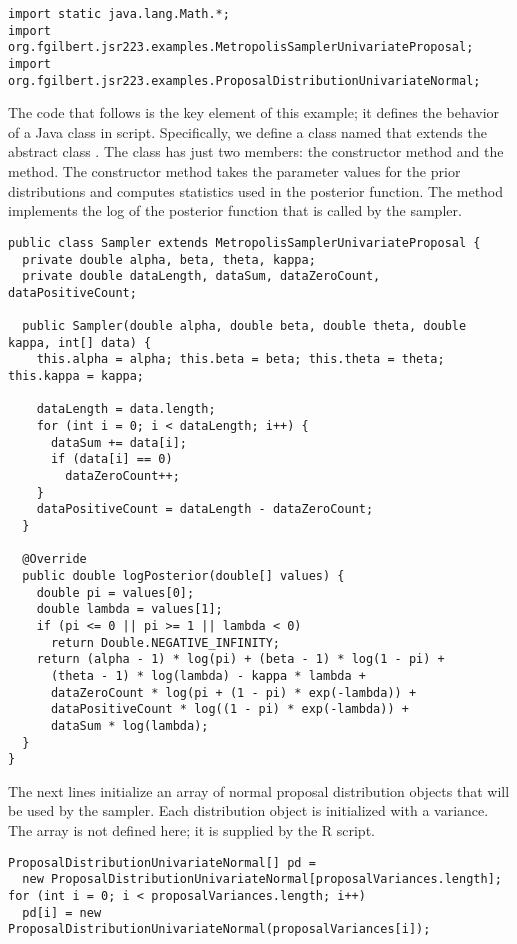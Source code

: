 \begin{verbatim}
import static java.lang.Math.*;
import org.fgilbert.jsr223.examples.MetropolisSamplerUnivariateProposal;
import org.fgilbert.jsr223.examples.ProposalDistributionUnivariateNormal;
\end{verbatim}

The code that follows is the key element of this example; it defines the behavior of a Java class in script. Specifically, we define a class named  that extends the abstract class . The  class has just two members: the constructor method and the  method. The constructor method takes the parameter values for the prior distributions and computes statistics used in the posterior function. The  method implements the log of the posterior function that is called by the sampler.

\begin{verbatim}
public class Sampler extends MetropolisSamplerUnivariateProposal {
  private double alpha, beta, theta, kappa;
  private double dataLength, dataSum, dataZeroCount, dataPositiveCount;

  public Sampler(double alpha, double beta, double theta, double kappa, int[] data) {
    this.alpha = alpha; this.beta = beta; this.theta = theta; this.kappa = kappa;

    dataLength = data.length;
    for (int i = 0; i < dataLength; i++) {
      dataSum += data[i];
      if (data[i] == 0)
        dataZeroCount++;
    }
    dataPositiveCount = dataLength - dataZeroCount;
  }

  @Override
  public double logPosterior(double[] values) {
    double pi = values[0];
    double lambda = values[1];
    if (pi <= 0 || pi >= 1 || lambda < 0)
      return Double.NEGATIVE_INFINITY;
    return (alpha - 1) * log(pi) + (beta - 1) * log(1 - pi) +
      (theta - 1) * log(lambda) - kappa * lambda +
      dataZeroCount * log(pi + (1 - pi) * exp(-lambda)) +
      dataPositiveCount * log((1 - pi) * exp(-lambda)) +
      dataSum * log(lambda);
  }
}
\end{verbatim}

The next lines initialize an array of normal proposal distribution objects that will be used by the sampler. Each distribution object is initialized with a variance. The  array is not defined here; it is supplied by the R script.
\begin{verbatim}
ProposalDistributionUnivariateNormal[] pd =
  new ProposalDistributionUnivariateNormal[proposalVariances.length];
for (int i = 0; i < proposalVariances.length; i++)
  pd[i]	= new ProposalDistributionUnivariateNormal(proposalVariances[i]);
\end{verbatim}

